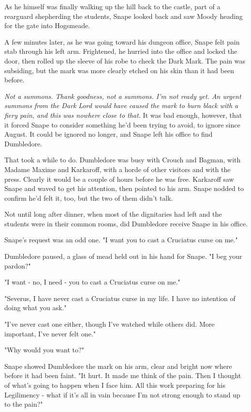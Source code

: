 As he himself was finally walking up the hill back to the castle, part of a rearguard shepherding the students, Snape looked back and saw Moody heading for the gate into Hogsmeade.

A few minutes later, as he was going toward his dungeon office, Snape felt pain stab through his left arm. Frightened, he hurried into the office and locked the door, then rolled up the sleeve of his robe to check the Dark Mark. The pain was subsiding, but the mark was more clearly etched on his skin than it had been before.

\emph{Not a summons. Thank goodness, not a summons. I'm not ready yet. An urgent summons from the Dark Lord would have caused the mark to burn black with a fiery pain, and this was nowhere close to that.} It was bad enough, however, that it forced Snape to consider something he'd been trying to avoid, to ignore since August. It could be ignored no longer, and Snape left his office to find Dumbledore.

That took a while to do. Dumbledore was busy with Crouch and Bagman, with Madame Maxime and Karkaroff, with a horde of other visitors and with the press. Clearly it would be a couple of hours before he was free. Karkaroff saw Snape and waved to get his attention, then pointed to his arm. Snape nodded to confirm he'd felt it, too, but the two of them didn't talk.

Not until long after dinner, when most of the dignitaries had left and the students were in their common rooms, did Dumbledore receive Snape in his office.

Snape's request was an odd one. "I want you to cast a Cruciatus curse on me."

Dumbledore paused, a glass of mead held out in his hand for Snape. "I beg your pardon?"

"I want - no, I need - you to cast a Cruciatus curse on me."

"Severus, I have never cast a Cruciatus curse in my life. I have no intention of doing what you ask."

"I've never cast one either, though I've watched while others did. More important, I've never felt one."

"Why would you want to?"

Snape showed Dumbledore the mark on his arm, clear and bright now where before it had been faint. "It hurt. It made me think of the pain. Then I thought of what's going to happen when I face him. All this work preparing for his Legilimency - what if it's all in vain because I'm not strong enough to stand up to the pain?"

